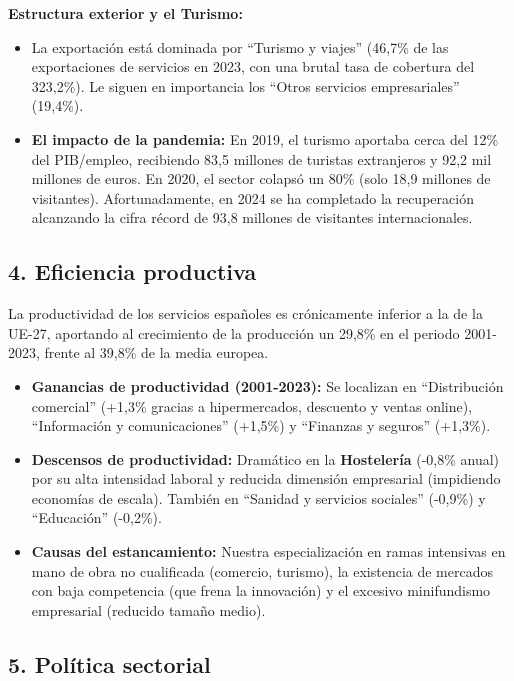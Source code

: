 \textbf{Estructura exterior y el Turismo:}

\begin{itemize}
  \item La exportación está dominada por ``Turismo y viajes'' (46,7\% de las exportaciones de servicios en 2023, con una brutal tasa de cobertura del 323,2\%). Le siguen en importancia los ``Otros servicios empresariales'' (19,4\%).
  \item \textbf{El impacto de la pandemia:} En 2019, el turismo aportaba cerca del 12\% del PIB/empleo, recibiendo 83,5 millones de turistas extranjeros y 92,2 mil millones de euros. En 2020, el sector colapsó un 80\% (solo 18,9 millones de visitantes). Afortunadamente, en 2024 se ha completado la recuperación alcanzando la cifra récord de 93,8 millones de visitantes internacionales.
\end{itemize}

\subsection*{4. Eficiencia productiva}

La productividad de los servicios españoles es crónicamente inferior a la de la UE-27, aportando al crecimiento de la producción un 29,8\% en el periodo 2001-2023, frente al 39,8\% de la media europea.

\begin{itemize}
  \item \textbf{Ganancias de productividad (2001-2023):} Se localizan en ``Distribución comercial'' (+1,3\% gracias a hipermercados, descuento y ventas online), ``Información y comunicaciones'' (+1,5\%) y ``Finanzas y seguros'' (+1,3\%).
  \item \textbf{Descensos de productividad:} Dramático en la \textbf{Hostelería} (-0,8\% anual) por su alta intensidad laboral y reducida dimensión empresarial (impidiendo economías de escala). También en ``Sanidad y servicios sociales'' (-0,9\%) y ``Educación'' (-0,2\%).
  \item \textbf{Causas del estancamiento:} Nuestra especialización en ramas intensivas en mano de obra no cualificada (comercio, turismo), la existencia de mercados con baja competencia (que frena la innovación) y el excesivo minifundismo empresarial (reducido tamaño medio).
\end{itemize}

\subsection*{5. Política sectorial}

